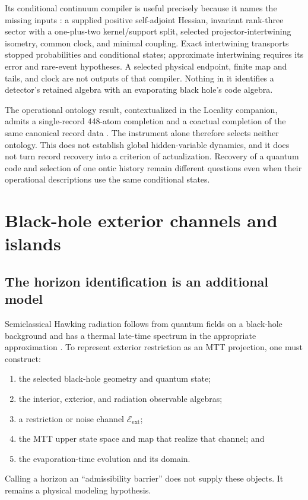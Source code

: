 \documentclass[11pt]{article}
\newcommand{\E}{\mathcal E}
\begin{document}
Its conditional continuum compiler is useful precisely because it names the
missing inputs \cite{BornCompanion,FrozenContinuum}: a supplied positive
self-adjoint Hessian, invariant rank-three sector with a one-plus-two
kernel/support split, selected projector-intertwining isometry, common clock,
and minimal coupling. Exact intertwining transports stopped probabilities
and conditional states; approximate intertwining requires its error and
rare-event hypotheses. A selected physical endpoint, finite map and tails,
and clock are not outputs of that compiler. Nothing in it identifies a
detector's retained algebra with an evaporating black hole's code algebra.

The operational ontology result, contextualized in the Locality companion,
admits a single-record 448-atom completion and a coactual completion of the
same canonical record data \cite{LocalityCompanion,FrozenOntology}. The
instrument alone therefore selects neither ontology. This does not establish
global hidden-variable dynamics, and it does not turn record recovery into
a criterion of actualization. Recovery of a quantum code and selection of
one ontic history remain different questions even when their operational
descriptions use the same conditional states.

\section{Black-hole exterior channels and islands}

\subsection{The horizon identification is an additional model}

Semiclassical Hawking radiation follows from quantum fields on a black-hole
background and has a thermal late-time spectrum in the appropriate
approximation \cite{Hawking1975}. To represent exterior restriction as an MTT
projection, one must construct:
\begin{enumerate}
\item the selected black-hole geometry and quantum state;
\item the interior, exterior, and radiation observable algebras;
\item a restriction or noise channel $\E_{\mathrm{ext}}$;
\item the MTT upper state space and map that realize that channel; and
\item the evaporation-time evolution and its domain.
\end{enumerate}
Calling a horizon an ``admissibility barrier'' does not supply these objects.
It remains a physical modeling hypothesis.
\end{document}
